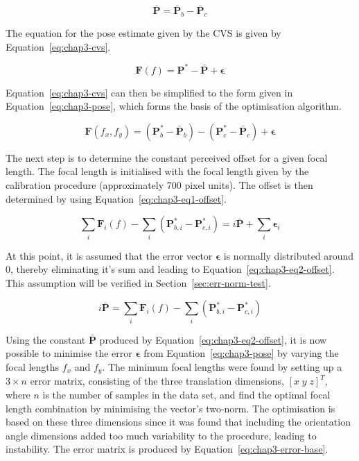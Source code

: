 \begin{equation}
  \label{eq:chap3-offset}
  \bar{\bm{P}} = \bar{\bm{P}}_b - \bar{\bm{P}}_c
\end{equation}

The equation for the pose estimate given by the CVS is given by Equation~\ref{eq:chap3-cvs}.

\begin{equation}
  \label{eq:chap3-cvs}
  \bm{F}(f) = \bm{P}^* - \bar{\bm{P}} + \bm{\epsilon}
\end{equation}

Equation~\ref{eq:chap3-cvs} can then be simplified to the form given in Equation~\ref{eq:chap3-pose}, which forms the basis of the optimisation algorithm. 

\begin{equation}
  \label{eq:chap3-pose}
  \bm{F}(f_x, f_y) = (\bm{P}^*_b - \bar{\bm{P}}_b) - (\bm{P}^*_c - \bar{\bm{P}}_c) + \bm{\epsilon}
\end{equation}

The next step is to determine the constant perceived offset for a given focal length. The focal length is initialised with the focal length given by the calibration procedure (approximately 700 pixel units). The offset is then determined by using Equation~\ref{eq:chap3-eq1-offset}.

\begin{equation}
  \label{eq:chap3-eq1-offset}
  \sum\limits_i \bm{F}_i(f) - \sum\limits_i(\bm{P}^*_{b,i} - \bm{P}^*_{c, i}) = i\bar{\bm{P}} + \sum\limits_i\bm{\epsilon}_i
\end{equation}

At this point, it is assumed that the error vector $\bm{\epsilon}$ is normally distributed around $0$, thereby eliminating it's sum and leading to Equation~\ref{eq:chap3-eq2-offset}. This assumption will be verified in Section~\ref{sec:err-norm-test}. 

\begin{equation}
  \label{eq:chap3-eq2-offset}
  i\bar{\bm{P}} = \sum\limits_i \bm{F}_i(f) - \sum\limits_i(\bm{P}^*_{b,i} - \bm{P}^*_{c, i})
\end{equation}

Using the constant $\bar{\bm{P}}$ produced by Equation~\ref{eq:chap3-eq2-offset}, it is now possible to minimise the error $\bm{\epsilon}$ from Equation~\ref{eq:chap3-pose} by varying the focal lengths $f_x$ and $f_y$. The minimum focal lengths were found by setting up a $3\times n$ error matrix, consisting of the three translation dimensions, ${[x\;y\;z]}^T$, where $n$ is the number of samples in the data set, and find the optimal focal length combination by minimising the vector's  two-norm. The optimisation is based on these three dimensions since it was found that including the orientation angle dimensions added too much variability to the procedure, leading to instability. The error matrix is produced by Equation~\ref{eq:chap3-error-base}.

